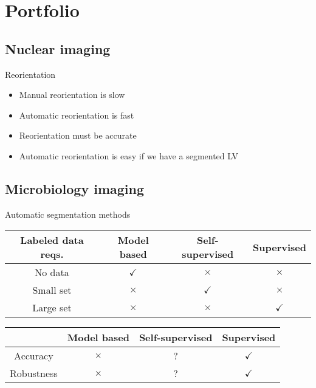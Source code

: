 \documentclass[aspectratio=169]{beamer}
\begin{document}
\section{Portfolio}
\subsection{Nuclear imaging}
\begin{frame}{Reorientation}
    \begin{itemize}
        \item<1->Manual reorientation is slow
        \item<2->Automatic reorientation is fast
        \item<3->Reorientation must be accurate
        \item<4->Automatic reorientation is easy if we have a segmented LV
    \end{itemize}
\end{frame}

\subsection{Microbiology imaging}

\begin{frame}{Automatic segmentation methods}
    \begin{center}
        \begin{tabular}{ c || c | c | c}
            Labeled data reqs. & Model based & Self-supervised & Supervised \\
            \hline
            No data & $\checkmark$ & $\times$ & $\times$ \\
            Small set & $\times$ & $\checkmark$ & $\times$ \\
            Large set & $\times$ & $\times$ & $\checkmark$
        \end{tabular}

        \vspace{2em}

        \begin{tabular}{ c || c | c | c}
            & Model based & Self-supervised & Supervised \\
            \hline
            Accuracy & $\times$ & ? & $\checkmark$ \\
            Robustness & $\times$ & ? & $\checkmark$ \\
        \end{tabular}
    \end{center}
\end{frame}
\end{document}
